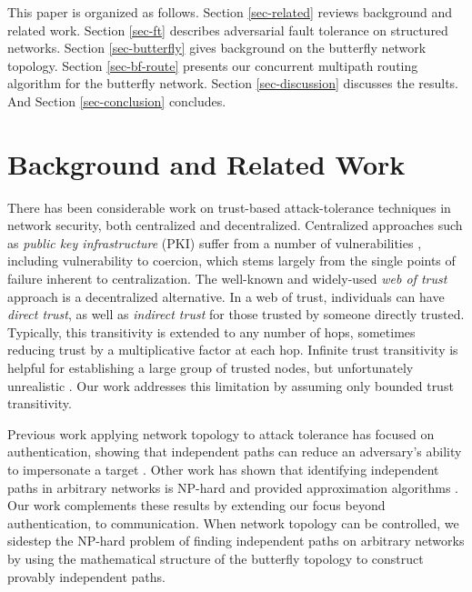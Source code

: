 \documentclass[10pt,letterpaper]{article}
\begin{document}
This paper is organized as follows.
Section \ref{sec-related} reviews background and related work.
Section \ref{sec-ft} describes adversarial fault tolerance on
structured networks.
Section \ref{sec-butterfly} gives background on the butterfly network topology.
Section \ref{sec-bf-route} presents our concurrent multipath routing
algorithm for the butterfly network.
Section \ref{sec-discussion} discusses the results.
And Section \ref{sec-conclusion} concludes.

\section*{Background and Related Work}
\label{sec-related}

There has been considerable work on trust-based attack-tolerance techniques
in network security, both centralized and decentralized.
Centralized approaches such as {\em public key infrastructure} (PKI)
suffer from a number of vulnerabilities
\cite{ellison_ten_2000}, including vulnerability to coercion,
which stems largely from the single points of failure inherent to
centralization.
The well-known and widely-used {\em web of trust} approach
\cite{zimmermann_official_1995,richters_trust_2011}
is a decentralized alternative.
In a web of trust,
individuals can have {\em direct trust},
as well as {\em indirect trust} for those trusted by someone directly trusted.
Typically, this transitivity is extended to any number of hops,
sometimes reducing trust by a multiplicative factor at each hop.
Infinite trust transitivity is helpful for establishing a large group of
trusted nodes, but unfortunately unrealistic
\cite{christianson_why_1997}.
Our work addresses this limitation by assuming only
bounded trust transitivity.

Previous work applying network topology to attack tolerance has
focused on authentication,
showing that independent paths can reduce an adversary's ability
to impersonate a target
\cite{levien_attack-resistant_2009}.
Other work has shown that identifying independent paths in arbitrary networks
is NP-hard and provided approximation algorithms
\cite{reiter_resilient_1998}.
Our work complements these results by extending our focus beyond authentication,
to communication.
When network topology can be controlled, we sidestep the NP-hard problem of finding
independent paths on arbitrary networks by using the mathematical structure of
the butterfly topology to construct provably independent paths.
\end{document}
